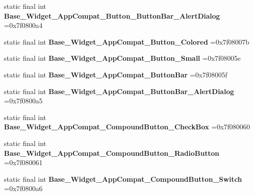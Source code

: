 \begin{DoxyCompactItemize}
\item 
\hypertarget{classcheck_1_1test_1_1_r_1_1style_aaa4a5e55c873e0ee9cbd5539c6d8e2e5}{}static final int {\bfseries Base\+\_\+\+Widget\+\_\+\+App\+Compat\+\_\+\+Button\+\_\+\+Button\+Bar\+\_\+\+Alert\+Dialog} =0x7f0800a4\label{classcheck_1_1test_1_1_r_1_1style_aaa4a5e55c873e0ee9cbd5539c6d8e2e5}

\item 
\hypertarget{classcheck_1_1test_1_1_r_1_1style_a8666db9ae9aacf8bf05f8939703d32b2}{}static final int {\bfseries Base\+\_\+\+Widget\+\_\+\+App\+Compat\+\_\+\+Button\+\_\+\+Colored} =0x7f08007b\label{classcheck_1_1test_1_1_r_1_1style_a8666db9ae9aacf8bf05f8939703d32b2}

\item 
\hypertarget{classcheck_1_1test_1_1_r_1_1style_a6aa6cc0b282fb63355c35f959f6997a1}{}static final int {\bfseries Base\+\_\+\+Widget\+\_\+\+App\+Compat\+\_\+\+Button\+\_\+\+Small} =0x7f08005e\label{classcheck_1_1test_1_1_r_1_1style_a6aa6cc0b282fb63355c35f959f6997a1}

\item 
\hypertarget{classcheck_1_1test_1_1_r_1_1style_a131db416c6e8cee28417614ceae3a859}{}static final int {\bfseries Base\+\_\+\+Widget\+\_\+\+App\+Compat\+\_\+\+Button\+Bar} =0x7f08005f\label{classcheck_1_1test_1_1_r_1_1style_a131db416c6e8cee28417614ceae3a859}

\item 
\hypertarget{classcheck_1_1test_1_1_r_1_1style_a97a3c7cab517a1bb67f644b4f42d60c7}{}static final int {\bfseries Base\+\_\+\+Widget\+\_\+\+App\+Compat\+\_\+\+Button\+Bar\+\_\+\+Alert\+Dialog} =0x7f0800a5\label{classcheck_1_1test_1_1_r_1_1style_a97a3c7cab517a1bb67f644b4f42d60c7}

\item 
\hypertarget{classcheck_1_1test_1_1_r_1_1style_a3785b393075ea4048606ab9dbedcc549}{}static final int {\bfseries Base\+\_\+\+Widget\+\_\+\+App\+Compat\+\_\+\+Compound\+Button\+\_\+\+Check\+Box} =0x7f080060\label{classcheck_1_1test_1_1_r_1_1style_a3785b393075ea4048606ab9dbedcc549}

\item 
\hypertarget{classcheck_1_1test_1_1_r_1_1style_afc4b4d58c58f690122f5cbe29fea27df}{}static final int {\bfseries Base\+\_\+\+Widget\+\_\+\+App\+Compat\+\_\+\+Compound\+Button\+\_\+\+Radio\+Button} =0x7f080061\label{classcheck_1_1test_1_1_r_1_1style_afc4b4d58c58f690122f5cbe29fea27df}

\item 
\hypertarget{classcheck_1_1test_1_1_r_1_1style_a5483f85f53b4e9e3e9281a24a79f67d1}{}static final int {\bfseries Base\+\_\+\+Widget\+\_\+\+App\+Compat\+\_\+\+Compound\+Button\+\_\+\+Switch} =0x7f0800a6\label{classcheck_1_1test_1_1_r_1_1style_a5483f85f53b4e9e3e9281a24a79f67d1}


\end{DoxyCompactItemize}
